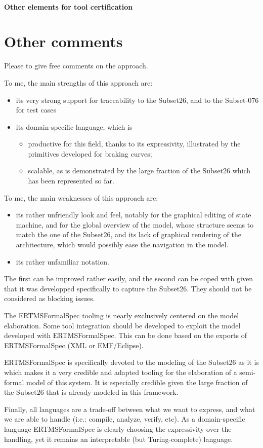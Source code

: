 \paragraph{Other elements for tool certification}

\section{Other comments}
Please to  give free comments on the approach.

\begin{assessor1}
To me, the main strengths of this approach are: 
\begin{itemize}
\item its very strong support for traceability to the Subset26, and to the Subset-076 for test cases
\item its domain-specific language, which is
\begin{itemize}
\item productive for this field, thanks to its expressivity, illustrated by the primitives developed for braking curves; 
\item scalable, as is demonstrated by the large fraction of the Subset26 which has been represented so far. 
\end{itemize}
\end{itemize}

To me, the main weaknesses of this approach are: 
\begin{itemize}
\item its rather unfriendly look and feel, notably for the graphical editing of state machine, and for the global overview of the model, whose structure seems to match the one of the Subset26, and its lack of graphical rendering of the architecture, which would possibly ease the navigation in the model. 
\item its rather unfamiliar notation. 
\end{itemize}
The first can be improved rather easily, and the second can be coped with given that it was developped specifically to capture the Subset26. They should not be considered as blocking issues. 

The ERTMSFormalSpec tooling is nearly exclusively centered on the model elaboration. Some tool integration should be developed to exploit the model developed with ERTMSFormalSpec. This can be done based on the exports of ERTMSFormalSpec (XML or EMF/Eclipse). 

ERTMSFormalSpec is specifically devoted to the modeling of the Subset26 as it is which makes it a very credible and adapted tooling for the elaboration of a semi-formal model of this system. It is especially credible given the large fraction of the Subset26 that is already modeled in this framework. 

Finally, all languages are a trade-off between what we want to express, and what we are able to handle (i.e.: compile, analyze, verify, etc). As a domain-specific language ERTMSFormalSpec is clearly choosing the expressivity over the handling, yet it remains an interpretable (but Turing-complete) language. 
\end{assessor1}


